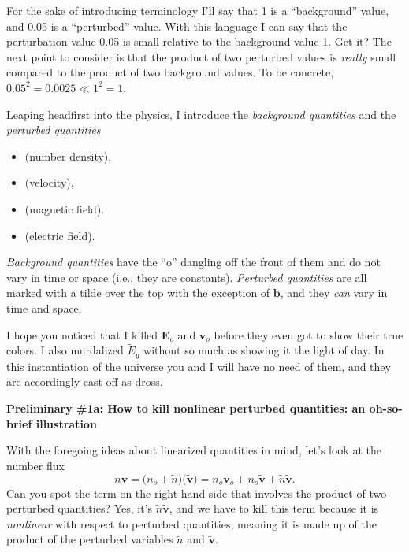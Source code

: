 For the sake of introducing terminology I'll say that 1 is a ``background''
value, and 0.05 is a ``perturbed'' value. With this language I can say that the
perturbation value 0.05 is small relative to the background value 1. Get it?
The next point to consider is that the product of two perturbed values is
\emph{really} small compared to the product of two background values. To be
concrete, $0.05^2 = 0.0025 \ll 1^2 = 1$.

Leaping headfirst into the physics, I introduce the \emph{background quantities} and
the \emph{perturbed quantities} \par
\begin{itemize}
\item {} (number density),
\item {} (velocity),
\item {} (magnetic field).
\item {} (electric field).
\end{itemize}
\emph{Background quantities} have the ``o'' dangling off the front of them and
do not vary in time or space (i.e., they are constants). \emph{Perturbed
  quantities} are all marked with a tilde over the top with the exception of
$\mathbf{b}$, and they \emph{can} vary in time and space. 

I hope you noticed that I killed $\mathbf{E}_o$ and $\mathbf{v}_o$ before they
even got to show their true colors. I also murdalized $\tilde E_y$ without so
much as showing it the light of day. In this instantiation of the universe you
and I will have no need of them, and they are accordingly cast off as dross.

\textbf{Preliminary \#1a:  How to kill nonlinear perturbed quantities: an oh-so-brief illustration}

With the foregoing ideas about linearized quantities in mind, let's look at the
number flux
\begin{equation}
  n \mathbf{v} = \Big ( n_o + \tilde n \Big ) \Big ( \mathbf{\tilde v} \Big ) = n_o \mathbf{v}_o + n_o \mathbf{\tilde v} + \tilde n \mathbf{\tilde v}.
\end{equation}
Can you spot the term on the right-hand side that involves the product of two
perturbed quantities? Yes, it's $\tilde n \mathbf{\tilde v}$, and we have to
kill this term because it is \emph{nonlinear} with respect to perturbed
quantities, meaning it is made up of the product of the perturbed variables
$\tilde n$ and $\mathbf{\tilde v}$.

